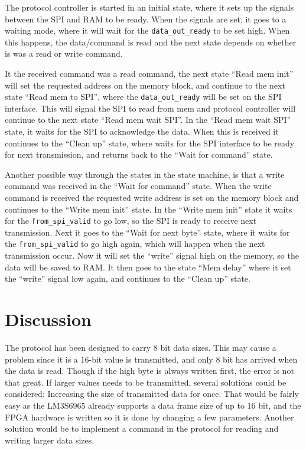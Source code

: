 
The protocol controller is started in an initial state, where it sets up the signals between the SPI and RAM to be ready. When the signals are set, it goes to a waiting mode, where it will wait for the \texttt{data\_out\_ready} to be set high. When this happens, the data/command is read and the next state depends on whether is was a read or write command.

It the received command was a read command, the next state ``Read mem init'' will set the requested address on the memory block, and continue to the next state ``Read mem to SPI'', where the \texttt{data\_out\_ready} will be set on the SPI interface. This will signal the SPI to read from mem and protocol controller will continue to the next state ``Read mem wait SPI''. In the ``Read mem wait SPI'' state, it waits for the SPI to acknowledge the data. When this is received it continues to the ``Clean up'' state, where waits for the SPI interface to be ready for next transmission, and returns back to the ``Wait for command'' state.

Another possible way through the states in the state machine, is that a write command was received in the ``Wait for command'' state. When the write command is received the requested write address is set on the memory block and continues to the ``Write mem init'' state. In the ``Write mem init'' state it waits for the \texttt{from\_spi\_valid} to go low, so the SPI is ready to receive next transmission. Next it goes to the ``Wait for next byte'' state, where it waits for the \texttt{from\_spi\_valid} to go high again, which will happen when the next transmission occur. Now it will set the ``write'' signal high on the memory, so the data will be saved to RAM. It then goes to the state ``Mem delay'' where it set the ``write'' signal low again, and continues to the ``Clean up'' state.


\section{Discussion}
The protocol has been designed to carry 8 bit data sizes. This may cause a problem since it is a 16-bit value is transmitted, and only 8 bit has arrived when the data is read. Though if the high byte is always written first, the error is not that great. If larger values needs to be transmitted, several solutions could be considered: Increasing the size of transmitted data for once. That would be fairly easy as the LM3S6965 already supports a data frame size of up to 16 bit, and the FPGA hardware is written so it is done by changing a few parameters. Another solution would be to implement a command in the protocol for reading and writing larger data sizes.


